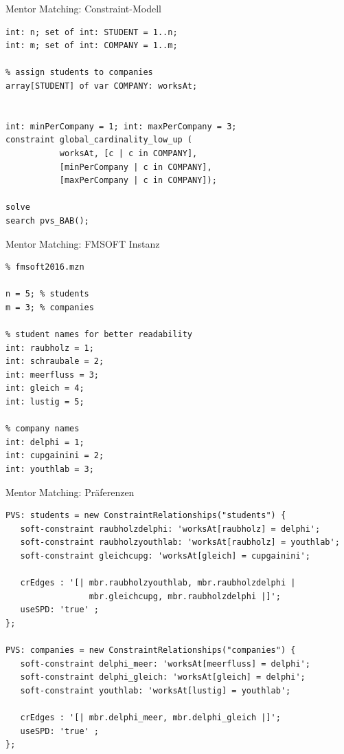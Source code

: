 \documentclass[handout,10pt,xcolor={dvipsnames},fleqn]{beamer}
\begin{document}
\begin{frame}[fragile]{Mentor Matching: Constraint-Modell}
\begin{lstlisting}
int: n; set of int: STUDENT = 1..n;
int: m; set of int: COMPANY = 1..m;

% assign students to companies
array[STUDENT] of var COMPANY: worksAt;


int: minPerCompany = 1; int: maxPerCompany = 3;
constraint global_cardinality_low_up ( 
           worksAt, [c | c in COMPANY], 
           [minPerCompany | c in COMPANY], 
           [maxPerCompany | c in COMPANY]); 
           
solve 
search pvs_BAB();
\end{lstlisting}
\end{frame}

\begin{frame}[fragile]{Mentor Matching: FMSOFT Instanz}
\begin{lstlisting}
% fmsoft2016.mzn

n = 5; % students
m = 3; % companies

% student names for better readability 
int: raubholz = 1;
int: schraubale = 2;
int: meerfluss = 3; 
int: gleich = 4; 
int: lustig = 5; 

% company names 
int: delphi = 1;
int: cupgainini = 2;
int: youthlab = 3;

\end{lstlisting}

\end{frame}

\begin{frame}[fragile]{Mentor Matching: Präferenzen}
\begin{lstlisting}
PVS: students = new ConstraintRelationships("students") {
   soft-constraint raubholzdelphi: 'worksAt[raubholz] = delphi';
   soft-constraint raubholzyouthlab: 'worksAt[raubholz] = youthlab';
   soft-constraint gleichcupg: 'worksAt[gleich] = cupgainini';
   
   crEdges : '[| mbr.raubholzyouthlab, mbr.raubholzdelphi | 
                 mbr.gleichcupg, mbr.raubholzdelphi |]';
   useSPD: 'true' ;
}; 

PVS: companies = new ConstraintRelationships("companies") {
   soft-constraint delphi_meer: 'worksAt[meerfluss] = delphi';
   soft-constraint delphi_gleich: 'worksAt[gleich] = delphi';
   soft-constraint youthlab: 'worksAt[lustig] = youthlab';
   
   crEdges : '[| mbr.delphi_meer, mbr.delphi_gleich |]';
   useSPD: 'true' ;
}; 

\end{lstlisting}
\end{frame}
\end{document}

